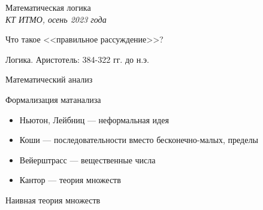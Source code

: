 \documentclass[aspectratio=169]{beamer}
\begin{document}
\newtheorem{axiom}{Аксиома}
\newtheorem{exmprus}{Пример}
\newtheorem{defrus}{Определение}
\newtheorem{lemmarus}{Лемма}
\newtheorem{thmrus}{Лемма}

\begin{frame}{}
\begin{center}{\Large Математическая логика}\\\itshape{КТ ИТМО, осень 2023 года}\end{center}
\end{frame}

\begin{frame}{Что такое <<правильное рассуждение>>?}
\end{frame}

\begin{frame}{Логика. Аристотель: 384-322 гг. до н.э.}
\end{frame}

\begin{frame}{Математический анализ}
\end{frame}

\begin{frame}{Формализация матанализа}
\begin{itemize}
\item Ньютон, Лейбниц --- неформальная идея
\vspace{1cm}
\item Коши --- последовательности вместо бесконечно-малых, пределы
\vspace{1cm}
\item Вейерштрасс --- вещественные числа
\vspace{1cm}
\item Кантор --- теория множеств
\end{itemize}
\end{frame}

%
\begin{frame}{Наивная теория множеств}
\end{frame}
\end{document}
